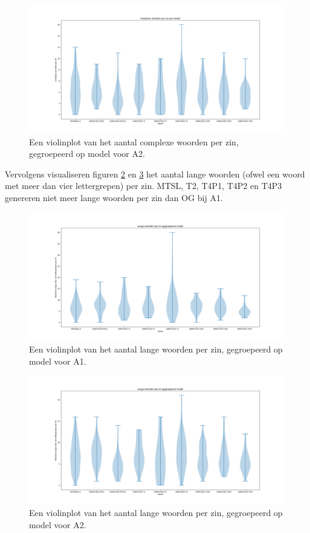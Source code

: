 \begin{figure}[H]
	\includegraphics[width=\linewidth]{img/violinplot-complex-a2.png}
	\caption{Een violinplot van het aantal complexe woorden per zin, gegroepeerd op model voor A2.}
	\label{img:violinplot-complex-a2}
\end{figure}

Vervolgens visualiseren figuren \ref{img:violinplot-long-a1} en \ref{img:violinplot-long-a2} het aantal lange woorden (ofwel een woord met meer dan vier lettergrepen) per zin. MTSL, T2, T4P1, T4P2 en T4P3 genereren niet meer lange woorden per zin dan OG bij A1.

\begin{figure}[H]
	\includegraphics[width=\linewidth]{img/violinplot-long-a1.png}
	\caption{Een violinplot van het aantal lange woorden per zin, gegroepeerd op model voor A1.}
	\label{img:violinplot-long-a1}
\end{figure}

\begin{figure}[H]
	\includegraphics[width=\linewidth]{img/violinplot-long-a2.png}
	\caption{Een violinplot van het aantal lange woorden per zin, gegroepeerd op model voor A2.}
	\label{img:violinplot-long-a2}
\end{figure}

